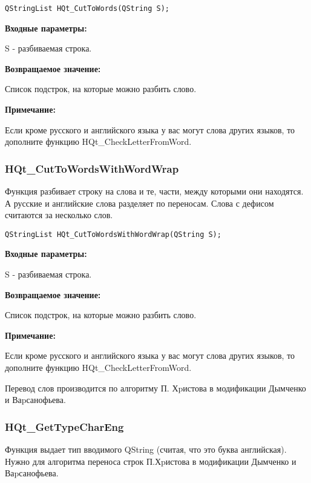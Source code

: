 \documentclass[a4paper,12pt]{article}
\begin{document}
\begin{lstlisting}[label=code_syntax_HQt_CutToWords,caption=Синтаксис]
QStringList HQt_CutToWords(QString S);
\end{lstlisting}

\textbf{Входные параметры:}

S - разбиваемая строка.

\textbf{Возвращаемое значение:}
 
Список подстрок, на которые можно разбить слово.

\textbf{Примечание:}

     Если кроме русского и английского языка у вас могут слова других языков, то дополните функцию HQt\_CheckLetterFromWord.


\subsubsection{HQt\_CutToWordsWithWordWrap}\label{HQt_CutToWordsWithWordWrap}

Функция разбивает строку на слова и те, части, между которыми они находятся. А русские и английские слова разделяет по переносам. Слова с дефисом считаются за несколько слов.


\begin{lstlisting}[label=code_syntax_HQt_CutToWordsWithWordWrap,caption=Синтаксис]
QStringList HQt_CutToWordsWithWordWrap(QString S);
\end{lstlisting}

\textbf{Входные параметры:}

S - разбиваемая строка.

\textbf{Возвращаемое значение:}
 
Список подстрок, на которые можно разбить слово.

\textbf{Примечание:}

     Если кроме русского и английского языка у вас могут слова других языков, то дополните функцию HQt\_CheckLetterFromWord.
	 
	 Перевод слов производится по алгоритму П. Хpистова в модификации Дымченко и Ваpсанофьева.


\subsubsection{HQt\_GetTypeCharEng}\label{HQt_GetTypeCharEng}

Функция выдает тип вводимого QString (считая, что это буква английская). Нужно для алгоритма переноса строк П.Хpистова в модификации Дымченко и Ваpсанофьева.
\end{document}
